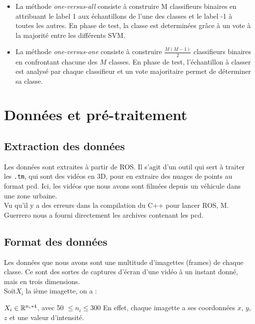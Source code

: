 	\begin{itemize}
	\item La méthode \emph{one-versus-all} consiste à construire M classifieurs binaires en attribuant le label 1 aux échantillons de l'une des classes et le label -1 à toutes les autres. En phase de test, la classe est determinées grâce à un vote à la majorité entre les différents SVM.
	\item La méthode \emph{one-versus-one} consiste à construire $\frac{M(M-1)}{2}$ classifieurs binaires en confrontant chacune des $M$ classes. En phase de test, l'échantillon à classer est analysé par chaque classifieur et un vote majoritaire permet de déterminer sa classe.\\
	\end{itemize}


\section{Données et pré-traitement}
\subsection{Extraction des données}

	Les données sont extraites à partir de ROS. Il s'agit d'un outil qui sert à traiter les \texttt{.tm}, qui sont des vidéos en 3D, pour en extraire des nuages de points au format pcd. Ici, les vidéos que nous avons sont filmées depuis un véhicule dans une zone urbaine.\\

	Vu qu’il y a des erreurs dans la compilation du C++ pour lancer ROS, M. Guerrero nous a fourni directement les archives contenant les pcd.\\

\subsection{Format des données}

	Les données que nous avons sont une multitude d'imagettes (frames) de chaque classe. Ce sont des sortes de captures d'écran d'une vidéo à un instant donné, mais en trois dimensions.\\

	Soit$ X_{i}$ la ième imagette, on a :

	$  X_{i} \in \mathbb{R}^{n_{i}*4} $, avec 50 $\leq n_{i} \leq 300$
	En effet, chaque imagette a ses coordonnées $x$, $y$, $z$ et une valeur d'intensité. \\

